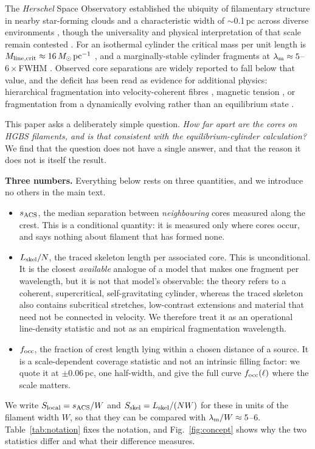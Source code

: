 \documentclass[usenatbib,twoside,twocolumn]{mnras}
\begin{document}
The \textit{Herschel} Space Observatory established the ubiquity of filamentary structure in nearby star-forming clouds \citep{Andre2010} and a characteristic width of $\sim$0.1\,pc across diverse environments \citep{Arzoumanian2011}, though the universality and physical interpretation of that scale remain contested \citep{Panopoulou2017,Panopoulou2022}. For an isothermal cylinder the critical mass per unit length is $M_{\rm line,crit}\approx16\,M_\odot\,{\rm pc^{-1}}$ \citep{Ostriker1964}, and a marginally-stable cylinder fragments at $\lambda_{\rm m}\approx5$--$6\times$FWHM \citep{Inutsuka1992,Fischera2012}. Observed core separations are widely reported to fall below that value, and the deficit has been read as evidence for additional physics: hierarchical fragmentation into velocity-coherent fibres \citep{Hacar2013,Hacar2018,Yang2024}, magnetic tension \citep{Nakamura1993}, or fragmentation from a dynamically evolving rather than an equilibrium state \citep{Andre2014,Clarke2016,Clarke2017,Clarke2020}.

This paper asks a deliberately simple question. \emph{How far apart are the cores on HGBS filaments, and is that consistent with the equilibrium-cylinder calculation?} We find that the question does not have a single answer, and that the reason it does not is itself the result.

\smallskip\noindent\textbf{Three numbers.} Everything below rests on three quantities, and we introduce no others in the main text.
\begin{itemize}\setlength{\itemsep}{1pt}
\item $s_{\rm ACS}$, the median separation between \emph{neighbouring} cores measured along the crest. This is a conditional quantity: it is measured only where cores occur, and says nothing about filament that has formed none.
\item $L_{\rm skel}/N$, the traced skeleton length per associated core. This is unconditional. It is the closest \emph{available} analogue of a model that makes one fragment per wavelength, but it is not that model's observable: the theory refers to a coherent, supercritical, self-gravitating cylinder, whereas the traced skeleton also contains subcritical stretches, low-contrast extensions and material that need not be connected in velocity. We therefore treat it as an operational line-density statistic and not as an empirical fragmentation wavelength.
\item $f_{\rm occ}$, the fraction of crest length lying within a chosen distance of a source. It is a scale-dependent coverage statistic and not an intrinsic filling factor: we quote it at $\pm0.06$\,pc, one half-width, and give the full curve $f_{\rm occ}(\ell)$ where the scale matters.
\end{itemize}
We write $S_{\rm local}=s_{\rm ACS}/W$ and $S_{\rm skel}=L_{\rm skel}/(NW)$ for these in units of the filament width $W$, so that they can be compared with $\lambda_{\rm m}/W\approx5$--$6$. Table~\ref{tab:notation} fixes the notation, and Fig.~\ref{fig:concept} shows why the two statistics differ and what their difference measures.
\end{document}
